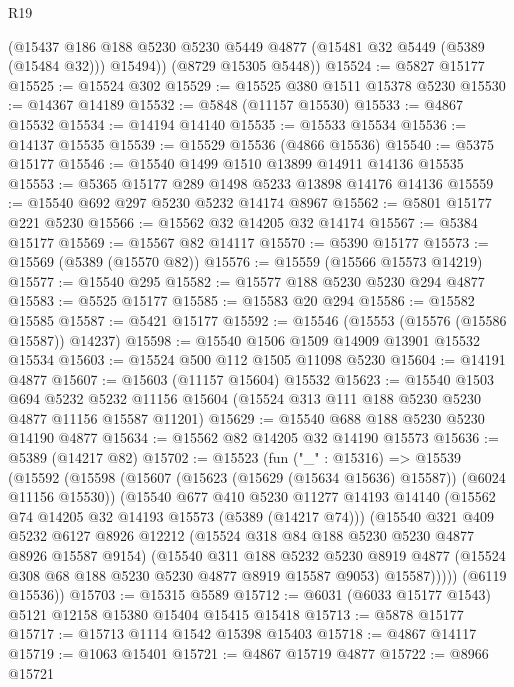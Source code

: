 \begin{lexlean}{R19}
\begin{coremodule}
        (@15437 @186 @188 @5230 @5230 @5449 @4877 (@15481 @32 @5449 (@5389 (@15484 @32))) @15494))
      (@8729 @15305 @5448))
@15524 := @5827 @15177
@15525 := @15524 @302
@15529 := @15525 @380 @1511 @15378 @5230
@15530 := @14367 @14189
@15532 := @5848 (@11157 @15530)
@15533 := @4867 @15532
@15534 := @14194 @14140
@15535 := @15533 @15534
@15536 := @14137 @15535
@15539 := @15529 @15536 (@4866 @15536)
@15540 := @5375 @15177
@15546 := @15540 @1499 @1510 @13899 @14911 @14136 @15535
@15553 := @5365 @15177 @289 @1498 @5233 @13898 @14176 @14136
@15559 := @15540 @692 @297 @5230 @5232 @14174 @8967
@15562 := @5801 @15177 @221 @5230
@15566 := @15562 @32 @14205 @32 @14174
@15567 := @5384 @15177
@15569 := @15567 @82 @14117
@15570 := @5390 @15177
@15573 := @15569 (@5389 (@15570 @82))
@15576 := @15559 (@15566 @15573 @14219)
@15577 := @15540 @295
@15582 := @15577 @188 @5230 @5230 @294 @4877
@15583 := @5525 @15177
@15585 := @15583 @20 @294
@15586 := @15582 @15585
@15587 := @5421 @15177
@15592 := @15546 (@15553 (@15576 (@15586 @15587)) @14237)
@15598 := @15540 @1506 @1509 @14909 @13901 @15532 @15534
@15603 := @15524 @500 @112 @1505 @11098 @5230
@15604 := @14191 @4877
@15607 := @15603 (@11157 @15604) @15532
@15623 := @15540
    @1503
    @694
    @5232
    @5232
    @11156
    @15604
    (@15524 @313 @111 @188 @5230 @5230 @4877 @11156 @15587 @11201)
@15629 := @15540 @688 @188 @5230 @5230 @14190 @4877
@15634 := @15562 @82 @14205 @32 @14190 @15573
@15636 := @5389 (@14217 @82)
@15702 := @15523
    (fun ("_" : @15316) =>
    @15539
      (@15592
        (@15598
          (@15607 (@15623 (@15629 (@15634 @15636) @15587)) (@6024 @11156 @15530))
          (@15540
            @677
            @410
            @5230
            @11277
            @14193
            @14140
            (@15562 @74 @14205 @32 @14193 @15573 (@5389 (@14217 @74)))
            (@15540
              @321
              @409
              @5232
              @6127
              @8926
              @12212
              (@15524 @318 @84 @188 @5230 @5230 @4877 @8926 @15587 @9154)
              (@15540
                @311
                @188
                @5232
                @5230
                @8919
                @4877
                (@15524 @308 @68 @188 @5230 @5230 @4877 @8919 @15587 @9053)
                @15587)))))
      (@6119 @15536))
@15703 := @15315 @5589
@15712 := @6031 (@6033 @15177 @1543) @5121 @12158 @15380 @15404 @15415 @15418
@15713 := @5878 @15177
@15717 := @15713 @1114 @1542 @15398 @15403
@15718 := @4867 @14117
@15719 := @1063 @15401
@15721 := @4867 @15719 @4877
@15722 := @8966 @15721

\end{coremodule}
\end{lexlean}
